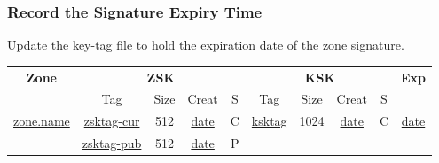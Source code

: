 
\subsubsection{Record the Signature Expiry Time}

Update the key-tag file to hold the expiration date of the zone signature.

\begin{center}
\begin{tabular}{|c|c|c|c|c|c|c|c|c|c|}
\hline
{\bf Zone} &
\multicolumn{4}{c|}{{\bf ZSK}} &
\multicolumn{4}{c|}{{\bf KSK}} &
{\bf Exp} \\
\cline{2-9}

 & Tag & Size & Creat & S & Tag & Size & Creat & S & \\
\hline

\underline{zone.name}	&
\underline{zsktag-cur}	&
512			&
\underline{date}	&
C			&
\underline{ksktag}	&
1024			&
\underline{date}	&
C			&
\underline{date}	\\

\cline{2-10}

			&
\underline{zsktag-pub}	&
512			&
\underline{date}	&
P			&
& & & & \\

\hline
\end{tabular}
\end{center}
